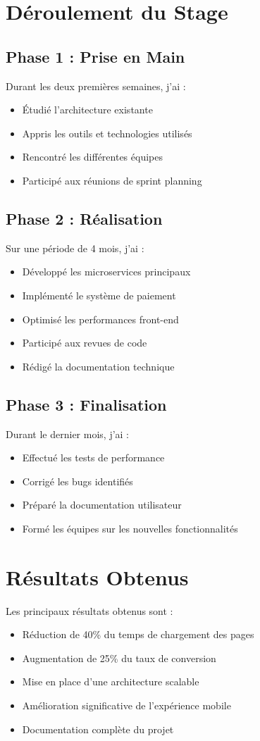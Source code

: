 \section{Déroulement du Stage}
\subsection{Phase 1 : Prise en Main}
Durant les deux premières semaines, j'ai :
\begin{itemize}
    \item Étudié l'architecture existante
    \item Appris les outils et technologies utilisés
    \item Rencontré les différentes équipes
    \item Participé aux réunions de sprint planning
\end{itemize}

\subsection{Phase 2 : Réalisation}
Sur une période de 4 mois, j'ai :
\begin{itemize}
    \item Développé les microservices principaux
    \item Implémenté le système de paiement
    \item Optimisé les performances front-end
    \item Participé aux revues de code
    \item Rédigé la documentation technique
\end{itemize}

\subsection{Phase 3 : Finalisation}
Durant le dernier mois, j'ai :
\begin{itemize}
    \item Effectué les tests de performance
    \item Corrigé les bugs identifiés
    \item Préparé la documentation utilisateur
    \item Formé les équipes sur les nouvelles fonctionnalités
\end{itemize}

\section{Résultats Obtenus}
Les principaux résultats obtenus sont :
\begin{itemize}
    \item Réduction de 40\% du temps de chargement des pages
    \item Augmentation de 25\% du taux de conversion
    \item Mise en place d'une architecture scalable
    \item Amélioration significative de l'expérience mobile
    \item Documentation complète du projet
\end{itemize} 